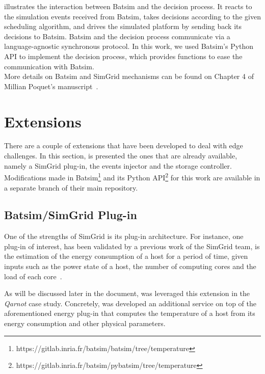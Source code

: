  illustrates the interaction between Batsim and the decision process. It reacts to the simulation events received from Batsim, takes decisions according to the given scheduling algorithm, and drives the simulated platform by sending back its decisions to Batsim.
Batsim and the decision process communicate via a language-agnostic synchronous protocol.
In this work, we used Batsim's Python API to implement the decision process, which provides functions to ease the communication with Batsim.\\

More details on Batsim and SimGrid mechanisms can be found on Chapter 4 of Millian Poquet's manuscript~\cite{MillianThesis}.

\section{Extensions}
There are a couple of extensions that have been developed to deal with edge challenges. In this section, is presented the ones that are already available, namely a SimGrid plug-in, the events injector and the storage controller.
Modifications made in Batsim\footnote{https://gitlab.inria.fr/batsim/batsim/tree/temperature} and its Python API\footnote{https://gitlab.inria.fr/batsim/pybatsim/tree/temperature} for this work are available in a separate branch of their main repository.

\subsection{Batsim/SimGrid Plug-in}
\label{sssec:plugins}

One of the strengths of SimGrid is its plug-in architecture.
For instance, one plug-in of interest, has been validated by a previous work of the SimGrid team, is the estimation of the energy consumption of a host for a period of time, given inputs such as the power state of a host, the number of computing cores and the load of each core~\cite{EnergyPlugin}.


As will be discussed later in the document, was leveraged this extension in the \emph{Qarnot} case study. Concretely, was developed an additional service on top of the aforementioned energy plug-in that computes the temperature of a host from its energy consumption and other physical parameters.

